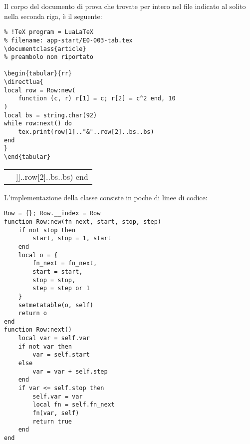 Il corpo del documento di prova che trovate per intero nel file indicato al
solito nella seconda riga, è il seguente:
\begin{tcolorbox}[sidebyside,righthand width=21mm]
\begin{Verbatim}
% !TeX program = LuaLaTeX
% filename: app-start/E0-003-tab.tex
\documentclass{article}
% preambolo non riportato

\begin{tabular}{rr}
\directlua{
local row = Row:new(
    function (c, r) r[1] = c; r[2] = c^2 end, 10
)
local bs = string.char(92)
while row:next() do
    tex.print(row[1].."&"..row[2]..bs..bs)
end
}
\end{tabular}

\end{Verbatim}
\tcblower
\begin{tabular}{rr}
\directlua{
local row = Row:new(function (c, r) r[1]=c; r[2] = c^2 end, 10)
local bs = string.char(92)
while row:next() do
tex.print(row[1]..[[&]]..row[2]..bs..bs)
end
}
\end{tabular}
\end{tcolorbox}

L'implementazione della classe  consiste in poche di linee di codice:
\begin{Verbatim}
Row = {}; Row.__index = Row
function Row:new(fn_next, start, stop, step)
    if not stop then
        start, stop = 1, start
    end
    local o = {
        fn_next = fn_next,
        start = start,
        stop = stop,
        step = step or 1
    }
    setmetatable(o, self)
    return o
end
function Row:next()
    local var = self.var
    if not var then
        var = self.start
    else
        var = var + self.step
    end
    if var <= self.stop then
        self.var = var
        local fn = self.fn_next
        fn(var, self)
        return true
    end
end
\end{Verbatim}

